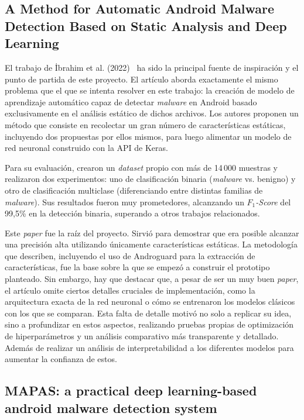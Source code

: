 \subsection{A Method for Automatic Android Malware Detection Based on Static Analysis and Deep Learning}

El trabajo de İbrahim et al. (2022)~\cite{9936621} ha sido la principal fuente de inspiración y el punto de partida de este proyecto. El artículo aborda exactamente el mismo problema que el que se intenta resolver en este trabajo: la creación de modelo de aprendizaje automático capaz de detectar \textit{malware} en Android basado exclusivamente en el análisis estático de dichos archivos. Los autores proponen un método que consiste en recolectar un gran número de características estáticas, incluyendo dos propuestas por ellos mismos, para luego alimentar un modelo de red neuronal construido con la API de Keras.

Para su evaluación, crearon un \textit{dataset} propio con más de 14\,000 muestras y realizaron dos experimentos: uno de clasificación binaria (\textit{malware} vs. benigno) y otro de clasificación multiclase (diferenciando entre distintas familias de \textit{malware}). Sus resultados fueron muy prometedores, alcanzando un \textit{$F_1$-Score} del 99,5\% en la detección binaria, superando a otros trabajos relacionados.

Este \textit{paper} fue la raíz del proyecto. Sirvió para demostrar que era posible alcanzar una precisión alta utilizando únicamente características estáticas. La metodología que describen, incluyendo el uso de Androguard para la extracción de características, fue la base sobre la que se empezó a construir el prototipo planteado. Sin embargo, hay que destacar que, a pesar de ser un muy buen \textit{paper}, el artículo omite ciertos detalles cruciales de implementación, como la arquitectura exacta de la red neuronal o cómo se entrenaron los modelos clásicos con los que se comparan. Esta falta de detalle motivó no solo a replicar su idea, sino a profundizar en estos aspectos, realizando pruebas propias de optimización de hiperparámetros y un análisis comparativo más transparente y detallado. Además de realizar un análisis de interpretabilidad a los diferentes modelos para aumentar la confianza de estos.

\subsection{MAPAS: a practical deep learning-based android malware detection system}

